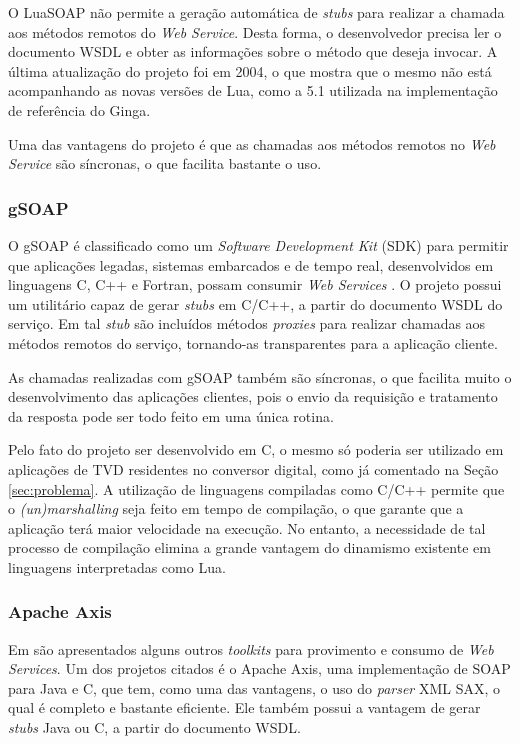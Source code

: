 O LuaSOAP não permite a geração automática de \textit{stubs} para realizar a chamada aos métodos remotos do \textit{Web Service}.
Desta forma, o desenvolvedor precisa ler o documento WSDL e obter as informações sobre o método que deseja invocar.
A última atualização do projeto foi em 2004, o que mostra que o mesmo não está acompanhando as novas
versões de Lua, como a 5.1 utilizada na implementação de referência do Ginga.

Uma das vantagens do projeto é que as chamadas aos métodos remotos no \textit{Web Service} são síncronas, o que facilita
bastante o uso.

\subsubsection{gSOAP}

O gSOAP é classificado como um \textit{Software Development Kit} (SDK) para permitir que aplicações legadas, sistemas embarcados e de tempo real, desenvolvidos em linguagens C, C++ e Fortran, possam consumir \textit{Web Services} \cite{van2005gsoap}. O projeto possui um utilitário capaz de gerar \textit{stubs} em C/C++, a partir do documento WSDL do serviço. Em tal \textit{stub} são incluídos métodos \textit{proxies} para realizar chamadas aos métodos remotos do serviço, tornando-as transparentes para a aplicação cliente.

As chamadas realizadas com gSOAP também são síncronas, o que facilita muito o desenvolvimento das aplicações clientes,
pois o envio da requisição e tratamento da resposta pode ser todo feito em uma única rotina.

Pelo fato do projeto ser desenvolvido em C, o mesmo só poderia ser utilizado
em aplicações de TVD residentes no conversor digital, como já comentado na Seção \ref{sec:problema}.
A utilização de linguagens compiladas como C/C++ permite que o \textit{(un)marshalling} 
seja feito em tempo de compilação, o que garante que a aplicação terá maior velocidade 
na execução. No entanto, a necessidade de tal processo de compilação elimina
a grande vantagem do dinamismo existente em linguagens interpretadas como Lua.

\subsubsection{Apache Axis}

Em \cite{davis2005latency} são apresentados alguns outros \textit{toolkits} para provimento e consumo de \textit{Web Services}. Um dos projetos citados é o Apache Axis, uma implementação de SOAP para Java e C, que tem, como uma das vantagens, o uso do \textit{parser} XML SAX, o qual é completo e bastante eficiente. Ele também possui a vantagem de gerar \textit{stubs} Java ou C, a partir do documento WSDL.

